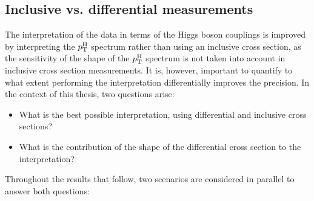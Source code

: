 \subsection{Inclusive vs. differential measurements}
\label{sec:interpretation-brs}

The interpretation of the data in terms of the Higgs boson couplings is improved by interpreting the $p_\mathrm{T}^\mathrm{H}$ spectrum rather than using an inclusive cross section, as the sensitivity of the shape of the $p_\mathrm{T}^\mathrm{H}$ spectrum is not taken into account in inclusive cross section measurements.
% 
It is, however, important to quantify to what extent performing the interpretation differentially improves the precision.
% 
In the context of this thesis, two questions arise:
% 
\begin{itemize}
\item What is the best possible interpretation, using differential and inclusive cross sections?
\item What is the contribution of the shape of the differential cross section to the interpretation?
\end{itemize}
% 
Throughout the results that follow, two scenarios are considered in parallel to answer both questions:
% 

